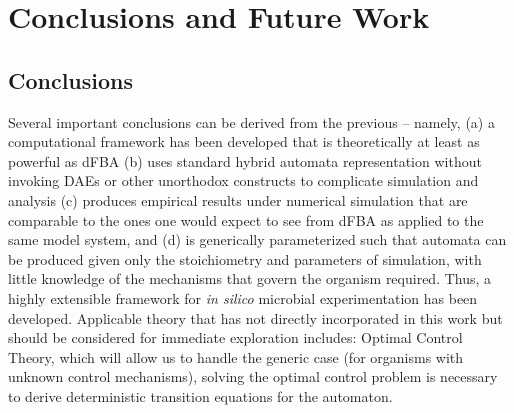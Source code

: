 \chapter{Conclusions and Future Work}\label{chap:conclusions}

\section{Conclusions}

Several important conclusions can be derived from the previous -- namely, (a) a computational framework has been developed that is theoretically at least as powerful as dFBA (b) uses standard hybrid automata representation without invoking DAEs or other unorthodox constructs to complicate simulation and analysis (c) produces empirical results under numerical simulation that are comparable to the ones one would expect to see from dFBA as applied to the same model system, and (d) is generically parameterized such that automata can be produced given only the stoichiometry and parameters of simulation, with little knowledge of the mechanisms that govern the organism required. Thus, a highly extensible framework for \textit{in silico} microbial experimentation has been developed. Applicable theory that has not directly incorporated in this work but should be considered for immediate exploration includes:
Optimal Control Theory, which will allow us to handle the generic case (for organisms with unknown control mechanisms), solving the optimal control problem is necessary to derive deterministic transition equations for the automaton. 


